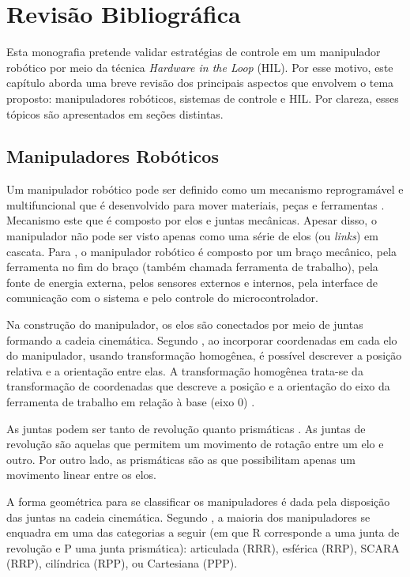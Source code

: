 \chapter{Revisão Bibliográfica}

Esta monografia pretende validar estratégias de controle em um manipulador robótico 
por meio da técnica \textit{Hardware in the Loop} (HIL). Por esse motivo, este capítulo 
aborda uma breve revisão dos principais aspectos que envolvem o tema proposto: manipuladores 
robóticos, sistemas de controle e HIL. Por clareza, esses tópicos são apresentados em seções 
distintas.


\section{Manipuladores Robóticos}

Um manipulador robótico pode ser definido como um mecanismo reprogramável e multifuncional
que é desenvolvido para mover materiais, peças e ferramentas \cite{Murphy:2000:IAR:517685}. 
Mecanismo este que é composto por elos e juntas mecânicas. Apesar disso, o manipulador não pode ser 
visto apenas como uma série de elos (ou \textit{links}) em cascata. Para , 
o manipulador robótico é composto por um braço mecânico, pela ferramenta no fim do braço 
(também chamada ferramenta de trabalho), pela fonte de energia externa, pelos sensores 
externos e internos, pela interface de comunicação com o sistema e pelo controle do microcontrolador.

Na construção do manipulador, os elos são conectados por meio de juntas formando a cadeia 
cinemática. Segundo , ao incorporar coordenadas em cada elo do manipulador, 
usando transformação homogênea, é possível descrever a posição relativa e a orientação entre elas.
A transformação homogênea trata-se da transformação de coordenadas que descreve a posição e a orientação 
do eixo da ferramenta de trabalho em relação à base (eixo $0$) \cite{siciliano}.

As juntas podem ser tanto de revolução quanto prismáticas \cite{paul1981robot}. As juntas de revolução
são aquelas que permitem um movimento de rotação entre um elo e outro. Por outro lado,
as prismáticas são as que possibilitam apenas um movimento linear entre os elos.

A forma geométrica para se classificar os manipuladores é dada pela disposição das juntas 
na cadeia cinemática. Segundo , a maioria dos manipuladores se 
enquadra em uma das categorias a seguir (em que R corresponde a uma junta de revolução 
e P uma junta prismática): articulada (RRR), esférica (RRP), SCARA (RRP), cilíndrica 
(RPP), ou Cartesiana (PPP).

